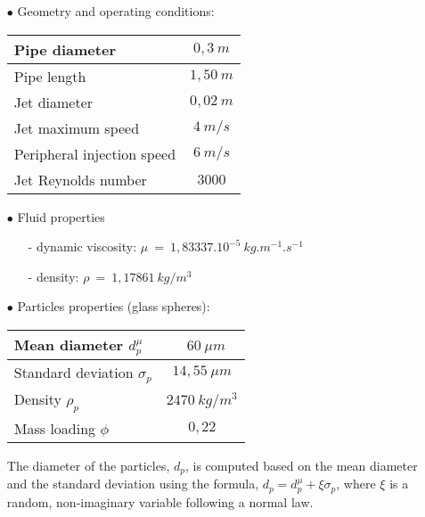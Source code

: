 \begin{itemize}

   \item[$\bullet$] Geometry and operating conditions:

         \begin{table}[!bth]
            \begin{center}
               \begin{tabular}{|l|c|} \hline
                  Pipe diameter              & $0,3~m $ \\ \hline
                  Pipe length                & $1,50~m$ \\ \hline
                  Jet diameter               & $0,02~m$ \\ \hline
                  Jet maximum speed          & $4 ~m/s$ \\ \hline
                  Peripheral injection speed & $6 ~m/s$ \\ \hline
                  Jet Reynolds number        & $3000$   \\ \hline
               \end{tabular}
            \end{center}
         \end{table}

   \item[$\bullet$] Fluid properties

         \begin{itemize}
            \item[-] dynamic viscosity: $\mu~=~1,83337.10^{-5}~kg.m^{-1}.s^{-1}$
            \item[-] density: $\rho~=~1,17861~kg/m^3$
         \end{itemize}
         \vspace{5mm}

   \item[$\bullet$] Particles properties (glass spheres):

         \begin{table}[!bth]
            \begin{center}
               \begin{tabular}{|l|c|} \hline
                  Mean diameter $d_p^{\mu}$       & \  $60~ \mu m$   \\ \hline
                  Standard deviation $\sigma_{p}$ & $14,55 ~\mu m$   \\ \hline
                  Density $\rho_{p}$              & $2470 ~kg/m^{3}$ \\ \hline
                  Mass loading $\phi$             & $0,22$           \\ \hline
               \end{tabular}
            \end{center}
         \end{table}

         \noindent
         The diameter of the particles, $d_p$, is computed based on the mean diameter and the standard deviation using the formula, $d_p = d_p^\mu + \xi \sigma_{p}$, where $\xi$ is a random, non-imaginary variable following a normal law.

\end{itemize}

